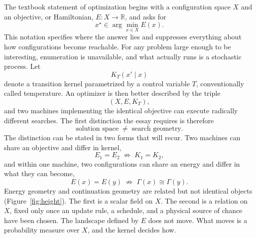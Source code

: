\documentclass[11pt]{article}
\theoremstyle{definition}
\theoremstyle{remark}
\newcommand{\R}{\mathbb{R}}
\begin{document}
The textbook statement of optimization begins with a configuration space $X$ and an objective, or Hamiltonian, $E : X \to \R$, and asks for
\begin{equation}
x^\star \in \arg\min_{x \in X} E(x).
\end{equation}
This notation specifies where the answer lies and suppresses everything about how configurations become reachable. For any problem large enough to be interesting, enumeration is unavailable, and what actually runs is a stochastic process. Let
\begin{equation}
K_T(x' \mid x)
\end{equation}
denote a transition kernel parametrized by a control variable $T$, conventionally called temperature. An optimizer is then better described by the triple
\begin{equation}
(X, E, K_T),
\end{equation}
and two machines implementing the identical objective can execute radically different searches. The first distinction the essay requires is therefore
\begin{equation}
\text{solution space} \;\neq\; \text{search geometry}.
\end{equation}
The distinction can be stated in two forms that will recur. Two machines can share an objective and differ in kernel,
\begin{equation}
E_1 = E_2 \;\not\Rightarrow\; K_1 = K_2 ,
\end{equation}
and within one machine, two configurations can share an energy and differ in what they can become,
\begin{equation}
E(x) = E(y) \;\not\Rightarrow\; \Gamma(x) \cong \Gamma(y).
\end{equation}
Energy geometry and continuation geometry are related but not identical objects (Figure~\ref{fig:height}). The first is a scalar field on $X$. The second is a relation on $X$, fixed only once an update rule, a schedule, and a physical source of chance have been chosen. The landscape defined by $E$ does not move. What moves is a probability measure over $X$, and the kernel decides how.
\end{document}
